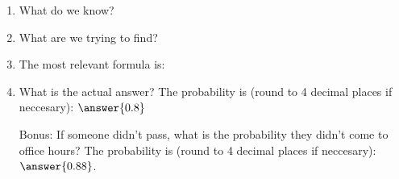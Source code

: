 \documentclass{ximera}
\begin{document}
 \begin{enumerate}
\item What do we know?

\begin{selectAll}
\end{selectAll}

\item What are we trying to find?

\begin{multipleChoice}




\end{multipleChoice}

\item The most relevant formula is:

\begin{multipleChoice}
\end{multipleChoice}

\item What is the actual answer?  The probability is (round to 4 decimal places if neccesary): $\answer{0.8}$

\item[Bonus:] If someone didn't pass, what is the probability they didn't come to office hours?  The probability is (round to 4 decimal places if neccesary): $\answer{0.88}$.

\end{enumerate}

 
 
 
 
      
\end{document}
